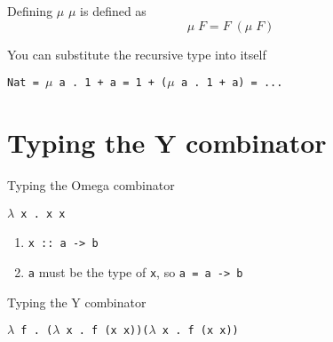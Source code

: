 \documentclass[10pt]{beamer}
\newcommand{\lam}[2]{$\lambda$ #1 . #2}
\newcommand{\yc}{\lam{f}{(\lam{x}{f (x x)})(\lam{x}{f (x x)})}}
\newcommand{\app}[2]{#1 \; #2}
\begin{document}
\begin{frame}[fragile]{Defining \textbf{$\mu$}}
  $\mu$ is defined as $$\app{\mu}{F} = \app{F}{(\app{\mu}{F})}$$

  You can substitute the recursive type into itself \\
  \begin{center}
  \texttt{Nat = $\mu$ a . 1 + a = 1 + ($\mu$ a . 1 + a) = ...}
  \end{center}
\end{frame}

\section{Typing the Y combinator}

\begin{frame}[fragile]{Typing the Omega combinator}
  \begin{center}
  \texttt{\lam{x}{x x}} \\
  \end{center}
  \vspace{0.4in}
  \begin{enumerate}
    \item \texttt{x :: a -> b}
    \item \texttt{a} must be the type of \texttt{x}, so \texttt{a = a -> b}
  \end{enumerate}
\end{frame}

\begin{frame}[fragile]{Typing the Y combinator}
  \begin{center}
  \texttt{\yc} \\
  \end{center}
  \vspace{0.2in}
  \begin{enumerate}
  \end{enumerate}
\end{frame}
\end{document}
